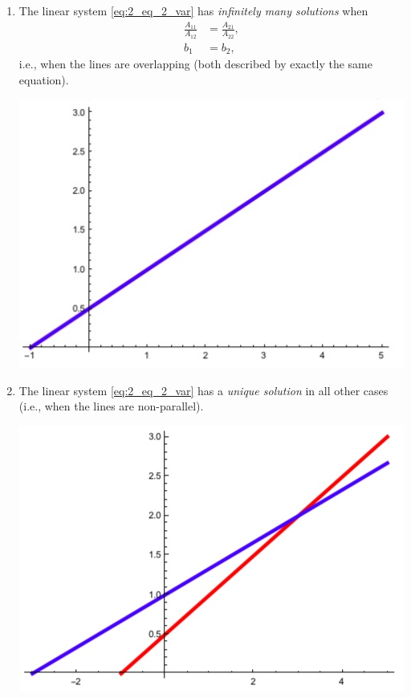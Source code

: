 \documentclass[12pt,letterpaper,reqno]{article}
\numberwithin{equation}{section}
\begin{document}
\begin{example}
\begin{enumerate}[(1)]
\item The linear system \eqref{eq:2_eq_2_var} has \emph{infinitely many solutions} when 
	\begin{align*}
		\frac{A_{11}}{A_{12}}&=\frac{A_{21}}{A_{22}}, \\
		b_1 & = b_2,
	\end{align*}
	i.e., when the lines are overlapping (both described by exactly the same equation).
	\begin{center}
	\includegraphics[scale=0.5]{figures_mvc/two_lines_inf_soln}		
	\end{center}

\item The linear system \eqref{eq:2_eq_2_var} has a \emph{unique solution} in all other cases (i.e., when the lines are non-parallel).
\begin{center}
\includegraphics[scale=0.5]{figures_mvc/two_lines_unique_soln}	
\end{center}
\end{enumerate}
\end{example}
\end{document}
